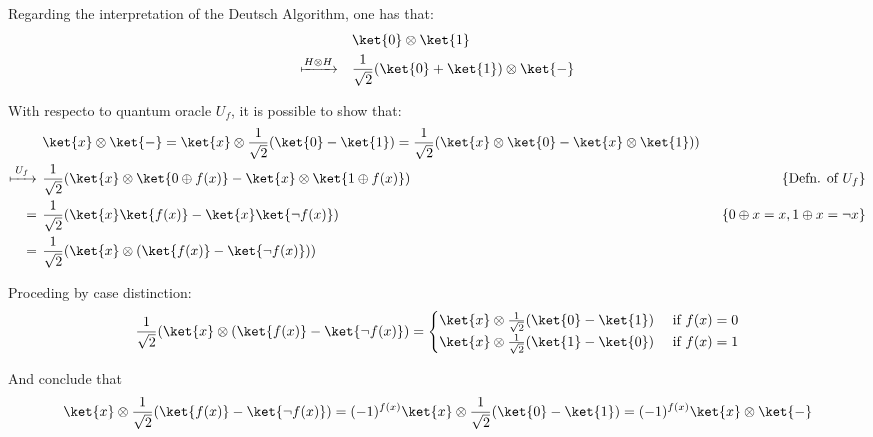 Regarding the interpretation of the Deutsch Algorithm, one has that:
\begin{equation}
\begin{split}
 & \ket{0} \otimes \ket{1} \\
 \xmapsto{ H \otimes H} \quad & \frac{1}{\sqrt{2}}(\ket{0} + \ket{1}) \otimes \ket{-} \\
\end{split}
\end{equation}

With respecto to  quantum oracle $U_f$, it is possible to show that:
\begin{equation}
\begin{split}
  &\ket{x} \otimes \ket{-} =   \ket{x} \otimes \frac{1}{\sqrt{2}}(\ket{0} - \ket{1}) = \frac{1}{\sqrt{2}}(\ket{x} \otimes \ket{0} - \ket{x} \otimes \ket{1})) \\
  \xmapsto{ \hspace{2pt} U_{f} \hspace{2pt}} \hspace{4pt} &  \frac{1}{\sqrt{2}}(\ket{x} \otimes \ket{0 \oplus f(x)} - \ket{x} \otimes \ket{1 \oplus f(x)}) &\hspace{50pt} \{\text{Defn. of } U_f\} \\
  = \hspace{4pt}  & \frac{1}{\sqrt{2}}(\ket{x} \ket{f(x)} - \ket{x} \ket{\neg f(x)}) & \{0\oplus x=x, 1\oplus x = \neg x\} \\
  = \hspace{4pt}  & \frac{1}{\sqrt{2}}(\ket{x} \otimes (\ket{f(x)}-\ket{\neg f(x)}))
 \end{split}
\end{equation}

Proceding by case distinction:
\begin{equation}
  \frac{1}{\sqrt{2}}(\ket{x} \otimes (\ket{f(x)}-\ket{\neg f(x)}) = 
  \begin{cases}
    \ket{x} \otimes \frac{1}{\sqrt{2}}(\ket{0}-\ket{1}) &\text{ if } f(x)=0    \\
    \ket{x} \otimes \frac{1}{\sqrt{2}}(\ket{1}-\ket{0}) &\text{ if }   f(x)= 1 
  \end{cases}
\end{equation}

And conclude that
\begin{equation}
 \ket{x} \otimes  \frac{1}{\sqrt{2}}(\ket{f(x)}-\ket{\neg f(x)}) = (-1)^{f(x)} \ket{x} \otimes \frac{1}{\sqrt{2}}(\ket{0}-\ket{1}) = (-1)^{f(x)} \ket{x} \otimes \ket{-}
\end{equation}

